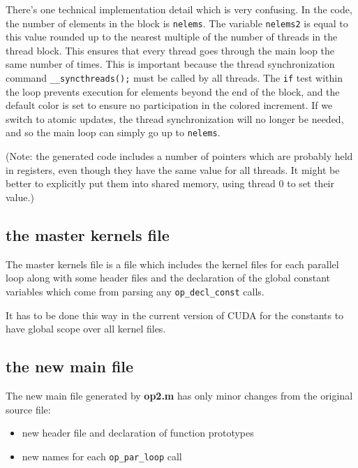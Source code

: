 \documentclass[12pt]{article}
\begin{document}
There's one technical implementation detail which is very confusing.
In the code, the number of elements in the block is {\tt nelems}.
The variable {\tt nelems2} is equal to this value rounded up to the 
nearest multiple of the number of threads in the thread block.
This ensures that every thread goes through the main loop the same 
number of times.  This is important because the thread synchronization 
command {\tt \_\_syncthreads();} must be called by all threads.
The {\tt if} test within the loop prevents execution for elements
beyond the end of the block, and the default color is set to ensure
no participation in the colored increment.
If we switch to atomic updates, the thread synchronization will
no longer be needed, and so the main loop can simply go up to
{\tt nelems}.

(Note: the generated code includes a number of pointers 
which are probably held in registers, even though they have the 
same value for all threads.  It might be better to explicitly put 
them into shared memory, using thread 0 to set their value.)

\newpage

\subsection{the master kernels file}

The master kernels file is a file which includes the kernel files for
each parallel loop along with some header files and the declaration
of the global constant variables which come from parsing any
{\tt op\_decl\_const} calls.

It has to be done this way in the current version of CUDA for the 
constants to have global scope over all kernel files.

\subsection{the new main file}

The new main file generated by {\bf op2.m} has only minor changes 
from the original source file:
\begin{itemize}
\item
new header file and declaration of function prototypes

\item
new names for each {\tt op\_par\_loop} call
\end{itemize}

\newpage
\end{document}
